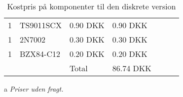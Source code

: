 \begin{table}[h!]
\begin{threeparttable}
\begin{tabular}{ l l l l l l l }
		   	1  &  TS9011SCX                 &  0.90 DKK   &  0.90 DKK  \\
  			1  &  2N7002                    &  0.30 DKK   &  0.30 DKK  \\
	  	    1  &  BZX84-C12                 &  0.20 DKK   &  0.20 DKK  \\
	        \hline
	  	      &                             & Total       & 86.74 DKK  \\  
			\hline
			\bottomrule
		\end{tabular}
		\begin{tablenotes}
		\item[a] \textit{Priser uden fragt.}
		\end{tablenotes}
		\caption{Kostpris på komponenter til den diskrete version}
	\end{threeparttable}
\end{table} 
\FloatBlock



